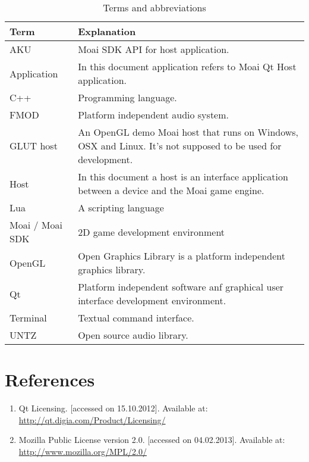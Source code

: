 \begin{table}[h!]
\begin{center}
\caption{Terms and abbreviations}
\label{deftable}
	\begin{tabular}{|l|p{}|}
	\hline
	Term & Explanation \\ 
	\hline \hline
	AKU & Moai SDK API for host application. \\
	\hline
	Application & In this document application refers to Moai Qt Host application. \\
        \hline
	C++ & Programming language.\\
	\hline
	FMOD & Platform independent audio system.\\
	\hline
        GLUT host & An OpenGL demo Moai host that runs on Windows, OSX and Linux. It's not supposed to be used for development. \\
        \hline
	Host & In this document a host is an interface application between a device and the Moai game engine.\\
	\hline
	Lua & A scripting language\\
	\hline
	Moai / Moai SDK & 2D game development environment\\
	\hline
	OpenGL & Open Graphics Library is a platform independent graphics library. \\
	\hline
	Qt & Platform independent software anf graphical user interface development environment.\\
	\hline
	Terminal & Textual command interface.\\
	\hline
        UNTZ & Open source audio library.\\
	\hline
	\end{tabular}
\end{center}
\end{table}

\section{References}

\begin{enumerate}
\item\label{itm:qtlicense} Qt Licensing. [accessed on 15.10.2012]. Available at:
  \url{http://qt.digia.com/Product/Licensing/}
\item\label{itm:mpl} Mozilla Public License version 2.0. [accessed on 04.02.2013]. Available at:
  \url{http://www.mozilla.org/MPL/2.0/}
\end{enumerate}

